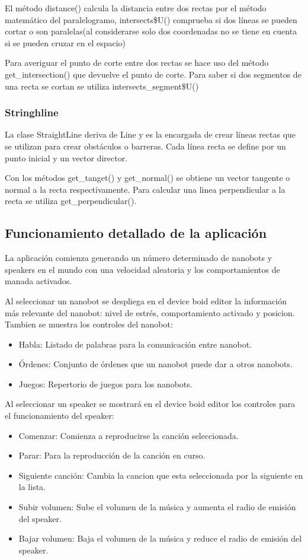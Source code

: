 El método distance() calcula la distancia entre dos rectas por el método matemático del paralelogramo, intersects\$U() comprueba si dos líneas se pueden cortar o son paralelas(al considerarse solo dos coordenadas no se tiene en cuenta si se pueden cruzar en el espacio)

Para averiguar el punto de corte entre dos rectas se hace uso del método get\_intersection() que devuelve el punto de corte. Para saber si dos segmentos de una recta se cortan se utiliza intersects\_segment\$U()

\subsubsection{Stringhline}
\label{sec:stringhline}
La clase StraightLine deriva de Line y es la encargada de crear  líneas rectas que se utilizan para crear obstáculos o barreras. Cada línea recta se define por un punto inicial y un vector director. 

Con los métodos get\_tanget() y get\_normal() se obtiene un vector tangente o normal a la recta respectivamente. Para calcular una linea perpendicular a la recta se utiliza get\_perpendicular().


\subsection{Funcionamiento detallado de la aplicación}
\label{sec:funcionamiento_aplicacion}
La aplicación comienza generando un número determinado de nanobots y speakers en el mundo con una velocidad aleatoria y los comportamientos de manada activados. 

Al seleccionar un nanobot se despliega en el device boid editor la información más relevante del nanobot: nivel de estrés, comportamiento activado y posicion. Tambien se muestra los controles del nanobot: 
\begin{itemize}
 \item Habla: Listado de palabras para la comunicación entre nanobot.
 \item Órdenes: Conjunto de órdenes que un nanobot puede dar a otros nanobots.
 \item Juegos: Repertorio de juegos para los nanobots.
\end{itemize}

Al seleccionar un speaker se mostrará en el device boid editor los controles para el funcionamiento del speaker:
\begin{itemize}
 \item Comenzar: Comienza a reproducirse la canción seleccionada.
 \item Parar: Para la reproducción de la canción en curso.
 \item Siguiente canción: Cambia la cancion que esta seleccionada por la siguiente en la lista.
 \item Subir volumen: Sube el volumen de la música y aumenta el radio de emisión del speaker.
 \item Bajar volumen: Baja el volumen de la música y reduce el radio de emisión del speaker.
\end{itemize}

